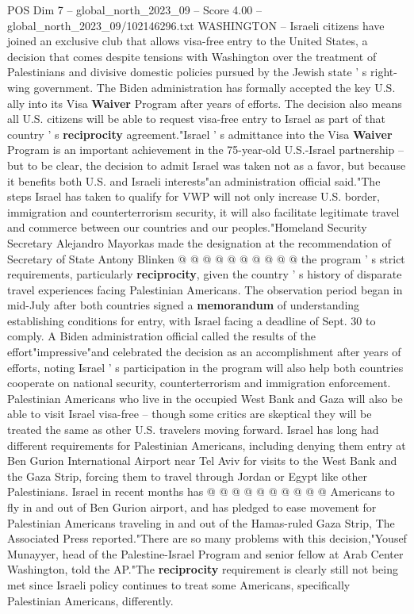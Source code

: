 \begin{textsample}{POS Dim 7 – global\_north\_2023\_09 – Score 4.00 – global\_north\_2023\_09/102146296.txt}  \label{ex:f7_pos_280}
WASHINGTON -- Israeli citizens have joined an exclusive club that allows visa-free entry to the United States, a decision that comes despite tensions with Washington over the treatment of Palestinians and divisive domestic policies pursued by the Jewish state ' s right-wing government.
The Biden administration has formally accepted the key U.S. ally into its Visa \textbf{Waiver} Program after years of efforts.
The decision also means all U.S. citizens will be able to request visa-free entry to Israel as part of that country ' s \textbf{reciprocity} agreement."Israel ' s admittance into the Visa \textbf{Waiver} Program is an important achievement in the 75-year-old U.S.-Israel partnership -- but to be clear, the decision to admit Israel was taken not as a favor, but because it benefits both U.S. and Israeli interests"an administration official said."The steps Israel has taken to qualify for VWP will not only increase U.S. border, immigration and counterterrorism security, it will also facilitate legitimate travel and commerce between our countries and our peoples."Homeland Security Secretary Alejandro Mayorkas made the designation at the recommendation of Secretary of State Antony Blinken @ @ @ @ @ @ @ @ @ @ the program ' s strict requirements, particularly \textbf{reciprocity}, given the country ' s history of disparate travel experiences facing Palestinian Americans.
The observation period began in mid-July after both countries signed a \textbf{memorandum} of understanding establishing conditions for entry, with Israel facing a deadline of Sept. 30 to comply.
A Biden administration official called the results of the effort"impressive"and celebrated the decision as an accomplishment after years of efforts, noting Israel ' s participation in the program will also help both countries cooperate on national security, counterterrorism and immigration enforcement.
Palestinian Americans who live in the occupied West Bank and Gaza will also be able to visit Israel visa-free -- though some critics are skeptical they will be treated the same as other U.S. travelers moving forward.
Israel has long had different requirements for Palestinian Americans, including denying them entry at Ben Gurion International Airport near Tel Aviv for visits to the West Bank and the Gaza Strip, forcing them to travel through Jordan or Egypt like other Palestinians.
Israel in recent months has @ @ @ @ @ @ @ @ @ @ Americans to fly in and out of Ben Gurion airport, and has pledged to ease movement for Palestinian Americans traveling in and out of the Hamas-ruled Gaza Strip, The Associated Press reported."There are so many problems with this decision,"Yousef Munayyer, head of the Palestine-Israel Program and senior fellow at Arab Center Washington, told the AP."The \textbf{reciprocity} requirement is clearly still not being met since Israeli policy continues to treat some Americans, specifically Palestinian Americans, differently.

\end{textsample}
